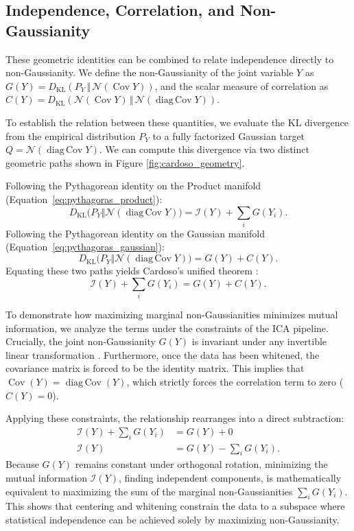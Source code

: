 \documentclass[12pt,a4paper,twoside,openany]{book}
\begin{document}
\subsection{Independence, Correlation, and Non-Gaussianity}
These geometric identities can be combined to relate independence directly to non-Gaussianity. 
We define the non-Gaussianity of the joint variable $Y$ as $G(Y) = D_{\mathrm{KL}}(P_Y \,\Vert\, \mathcal{N}(\operatorname{Cov} Y))$, 
and the scalar measure of correlation as $C(Y) = D_{\mathrm{KL}}(\mathcal{N}(\operatorname{Cov} Y) \,\Vert\, \mathcal{N}(\operatorname{diag\,Cov} Y))$. 

To establish the relation between these quantities, we evaluate the KL divergence from the empirical distribution $P_Y$ 
to a fully factorized Gaussian target $Q = \mathcal{N}(\operatorname{diag\,Cov} Y)$. 
We can compute this divergence via two distinct geometric paths shown in Figure \ref{fig:cardoso_geometry}. 

Following the Pythagorean identity on the Product manifold (Equation~\ref{eq:pythagoras_product}):
\begin{equation}
    D_{\mathrm{KL}}\big(P_Y \Vert \mathcal{N}(\operatorname{diag\,Cov} Y)\big) = \mathscr{I}(Y) + \sum_{i} G(Y_i).
\end{equation}
Following the Pythagorean identity on the Gaussian manifold (Equation~\ref{eq:pythagoras_gaussian}):
\begin{equation}
    D_{\mathrm{KL}}\big(P_Y \Vert \mathcal{N}(\operatorname{diag\,Cov} Y)\big) = G(Y) + C(Y).
\end{equation}
Equating these two paths yields Cardoso's unified theorem \cite{cardoso2022}:
\begin{equation}
    \mathscr{I}(Y) + \sum_{i} G(Y_i) = G(Y) + C(Y).
\end{equation}

To demonstrate how maximizing marginal non-Gaussianities minimizes mutual information, we analyze the terms under 
the constraints of the ICA pipeline. Crucially, the joint non-Gaussianity $G(Y)$ is invariant under any invertible 
linear transformation \cite{cardoso2022}. Furthermore, once the data has been whitened, the covariance matrix is forced to be the identity matrix. 
This implies that $\operatorname{Cov}(Y) = \operatorname{diag\,Cov}(Y)$, which strictly forces the correlation term to zero ($C(Y) = 0$). 

Applying these constraints, the relationship rearranges into a direct subtraction:
\begin{align}
    \mathscr{I}(Y) + \sum_{i} G(Y_i) &= G(Y) + 0 \nonumber \\
    \mathscr{I}(Y) &= G(Y) - \sum_{i} G(Y_i).
\end{align}
Because $G(Y)$ remains constant under orthogonal rotation, minimizing the mutual information $\mathscr{I}(Y)$, finding independent components, 
is mathematically equivalent to maximizing the sum of the marginal non-Gaussianities $\sum_i G(Y_i)$. 
This shows that centering and whitening constrain the data to a subspace where statistical 
independence can be achieved solely by maximizing non-Gaussianity.
\end{document}
